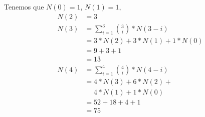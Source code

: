 \begin{enumerate}
    Tenemos que $N(0) = 1$, $N(1) = 1$,
    \begin{align*}
        N(2) &= 3\\
        N(3)
        &= \sum_{i=1}^3 \binom{3}{i} * N(3-i)\\
        &= 3 * N(2) + 3 * N(1) + 1 * N(0)\\
        &= 9 + 3 + 1\\
        &= 13\\
        N(4)
        &= \sum_{i=1}^4 \binom{4}{i} * N(4-i)\\
        &= 4 * N(3) + 6 * N(2) + {}\\
        &\phantom{{}={}} 4 * N(1) + 1 * N(0)\\
        &= 52 + 18 + 4 + 1\\
        &= 75
    \end{align*}
\end{enumerate}